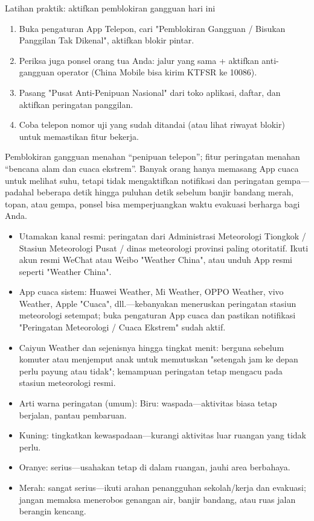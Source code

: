 \begin{tcbpractice}{Latihan praktik: aktifkan pemblokiran gangguan hari ini}
\begin{enumerate}
  \item Buka pengaturan App Telepon, cari "Pemblokiran Gangguan / Bisukan Panggilan Tak Dikenal", aktifkan blokir pintar.
  \item Periksa juga ponsel orang tua Anda: jalur yang sama + aktifkan anti-gangguan operator (China Mobile bisa kirim KTFSR ke 10086).
  \item Pasang "Pusat Anti-Penipuan Nasional" dari toko aplikasi, daftar, dan aktifkan peringatan panggilan.
  \item Coba telepon nomor uji yang sudah ditandai (atau lihat riwayat blokir) untuk memastikan fitur bekerja.
\end{enumerate}

\end{tcbpractice}


Pemblokiran gangguan menahan “penipuan telepon”; fitur peringatan menahan “bencana alam dan cuaca ekstrem”. Banyak orang hanya memasang App cuaca untuk melihat suhu, tetapi tidak mengaktifkan notifikasi dan peringatan gempa—padahal beberapa detik hingga puluhan detik sebelum banjir bandang merah, topan, atau gempa, ponsel bisa memperjuangkan waktu evakuasi berharga bagi Anda.


\begin{itemize}
  \item Utamakan kanal resmi: peringatan dari Administrasi Meteorologi Tiongkok / Stasiun Meteorologi Pusat / dinas meteorologi provinsi paling otoritatif. Ikuti akun resmi WeChat atau Weibo "Weather China", atau unduh App resmi seperti "Weather China".
  \item App cuaca sistem: Huawei Weather, Mi Weather, OPPO Weather, vivo Weather, Apple "Cuaca", dll.—kebanyakan meneruskan peringatan stasiun meteorologi setempat; buka pengaturan App cuaca dan pastikan notifikasi "Peringatan Meteorologi / Cuaca Ekstrem" sudah aktif.
  \item Caiyun Weather dan sejenisnya hingga tingkat menit: berguna sebelum komuter atau menjemput anak untuk memutuskan "setengah jam ke depan perlu payung atau tidak"; kemampuan peringatan tetap mengacu pada stasiun meteorologi resmi.
  \item Arti warna peringatan (umum): Biru: waspada—aktivitas biasa tetap berjalan, pantau pembaruan.
  \item Kuning: tingkatkan kewaspadaan—kurangi aktivitas luar ruangan yang tidak perlu.
  \item Oranye: serius—usahakan tetap di dalam ruangan, jauhi area berbahaya.
  \item Merah: sangat serius—ikuti arahan penangguhan sekolah/kerja dan evakuasi; jangan memaksa menerobos genangan air, banjir bandang, atau ruas jalan berangin kencang.
\end{itemize}

